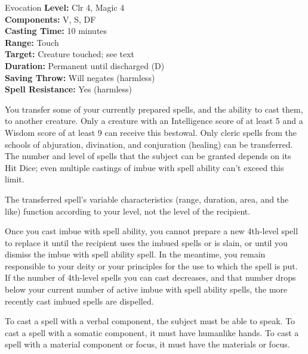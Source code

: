 {Evocation}
{
	\textbf{Level:}
	Clr 4, Magic 4\\
	\textbf{Components:}
	V, S, DF\\
	\textbf{Casting Time:}
	10 minutes\\
	\textbf{Range:}
	Touch\\
	\textbf{Target:}
	Creature touched; see text\\
	\textbf{Duration:}
	Permanent until discharged (D)\\
	\textbf{Saving Throw:}
	Will negates (harmless)\\
	\textbf{Spell Resistance:}
	Yes (harmless)\\
}
{
	You transfer some of your currently prepared spells, and the ability to cast them, to another creature. Only a creature with an Intelligence score of at least 5 and a Wisdom score of at least 9 can receive this bestowal. Only cleric spells from the schools of abjuration, divination, and conjuration (healing) can be transferred. The number and level of spells that the subject can be granted depends on its Hit Dice; even multiple castings of imbue with spell ability can't exceed this limit.


	The transferred spell's variable characteristics (range, duration, area, and the like) function according to your level, not the level of the recipient.

	Once you cast imbue with spell ability, you cannot prepare a new 4th-level spell to replace it until the recipient uses the imbued spells or is slain, or until you dismiss the imbue with spell ability spell. In the meantime, you remain responsible to your deity or your principles for the use to which the spell is put. If the number of 4th-level spells you can cast decreases, and that number drops below your current number of active imbue with spell ability spells, the more recently cast imbued spells are dispelled.

	To cast a spell with a verbal component, the subject must be able to speak. To cast a spell with a somatic component, it must have humanlike hands. To cast a spell with a material component or focus, it must have the materials or focus.

}
